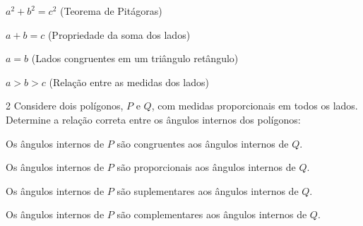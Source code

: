 \begin{escolha}[itemsep=0pt]
\item $a^2 + b^2 = c^2$ (Teorema de Pitágoras) 
\item $a + b = c$ (Propriedade da soma dos lados)
\item $a = b$ (Lados congruentes em um triângulo retângulo)
\item $a > b > c$ (Relação entre as medidas dos lados)
\end{escolha}



\num{2} Considere dois polígonos, $P$ e $Q$, com medidas proporcionais em todos
os lados. Determine a relação correta entre os ângulos internos dos
polígonos:

\begin{escolha}[itemsep=0pt]
  \item Os ângulos internos de $P$ são congruentes aos ângulos internos de $Q$. 
  \item Os ângulos internos de $P$ são proporcionais aos ângulos internos de $Q$.
  \item Os ângulos internos de $P$ são suplementares aos ângulos internos de $Q$.
  \item Os ângulos internos de $P$ são complementares aos ângulos internos de $Q$.
\end{escolha}

